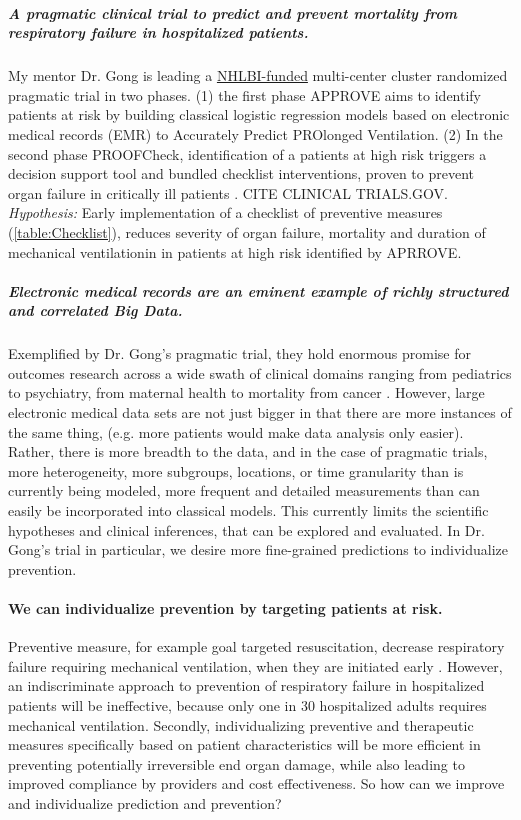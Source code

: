 \documentclass[11pt,notitlepage]{article}
\begin{document}
\subparagraph{A pragmatic clinical trial to predict and prevent mortality from respiratory failure in hospitalized patients.}  My mentor Dr. Gong is leading a \href{http://projectreporter.nih.gov/project_info_description.cfm?projectnumber=1UH2HL125119-01}{NHLBI-funded} multi-center cluster randomized pragmatic trial in two phases. (1) the first phase APPROVE aims to identify patients at risk by building classical logistic regression models based on electronic medical records (EMR) to Accurately Predict PROlonged Ventilation. (2) In the second phase PROOFCheck, identification of a patients at high risk triggers a decision support tool and bundled checklist interventions, proven to prevent organ failure in critically ill patients \cite{Levy_23103175,Lim_19783532,Barr_23269131,Girard_18191684,Hebert_9971864}. CITE CLINICAL TRIALS.GOV. \emph{Hypothesis:} Early implementation of a checklist of preventive measures (\ref{table:Checklist}), reduces severity of organ failure, mortality and duration of mechanical ventilationin in patients at high risk identified by APRROVE. 

\subparagraph{Electronic medical records are an eminent example of richly structured and correlated Big Data.} Exemplified by Dr. Gong's pragmatic trial, they hold enormous promise for outcomes research across a wide swath of clinical domains ranging from pediatrics to psychiatry, from maternal health to mortality from cancer \cite{Dean_19279318,Amarasingham20940649,Welch24782349,Smeeth_15602021,Dave_20819960,Man_23272239}. However, large electronic medical data sets are not just bigger in that there are more instances of the same thing, (e.g. more patients would make data analysis only easier).  Rather, there is more breadth to the data, and in the case of pragmatic trials, more heterogeneity, more subgroups, locations, or time granularity than is currently being modeled, more frequent and detailed measurements than can easily be incorporated into classical models.  This currently limits the scientific hypotheses and clinical inferences, that can be explored and evaluated. In Dr. Gong's trial in particular, we desire more fine-grained predictions to individualize prevention.  

\paragraph*{We can individualize prevention by targeting patients at risk.}
Preventive measure, for example goal targeted resuscitation, decrease respiratory failure requiring mechanical ventilation, when they are initiated early \cite{Rivers_12594312}. However, an indiscriminate approach to prevention of respiratory failure in hospitalized patients will be ineffective, because only one in 30 hospitalized adults requires mechanical ventilation. Secondly, individualizing preventive and therapeutic measures specifically based on patient characteristics will be more efficient in preventing potentially irreversible end organ damage, while also  leading to improved compliance by providers and cost effectiveness. So how can we improve and individualize prediction and prevention? 
\end{document}
